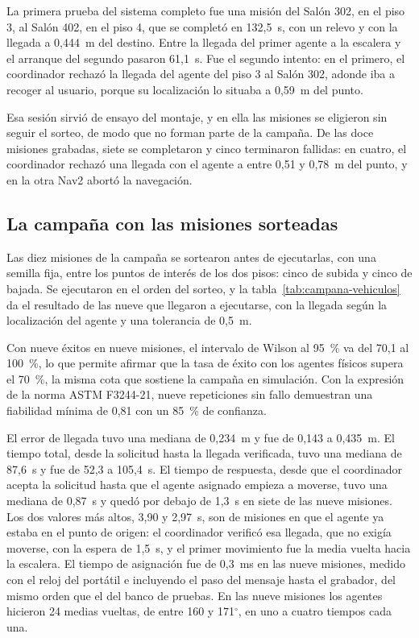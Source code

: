 La primera prueba del sistema completo fue una misión del Salón 302, en el piso 3, al Salón 402, en el piso 4, que se completó en 132,5~s, con un relevo y con la llegada a 0,444~m del destino. Entre la llegada del primer agente a la escalera y el arranque del segundo pasaron 61,1~s. Fue el segundo intento: en el primero, el coordinador rechazó la llegada del agente del piso 3 al Salón 302, adonde iba a recoger al usuario, porque su localización lo situaba a 0,59~m del punto.

Esa sesión sirvió de ensayo del montaje, y en ella las misiones se eligieron sin seguir el sorteo, de modo que no forman parte de la campaña. De las doce misiones grabadas, siete se completaron y cinco terminaron fallidas: en cuatro, el coordinador rechazó una llegada con el agente a entre 0,51 y 0,78~m del punto, y en la otra Nav2 abortó la navegación.

\subsection{La campaña con las misiones sorteadas}

Las diez misiones de la campaña se sortearon antes de ejecutarlas, con una semilla fija, entre los puntos de interés de los dos pisos: cinco de subida y cinco de bajada. Se ejecutaron en el orden del sorteo, y la tabla~\ref{tab:campana-vehiculos} da el resultado de las nueve que llegaron a ejecutarse, con la llegada según la localización del agente y una tolerancia de 0,5~m.

Con nueve éxitos en nueve misiones, el intervalo de Wilson al 95~\% va del 70,1 al 100~\%, lo que permite afirmar que la tasa de éxito con los agentes físicos supera el 70~\%, la misma cota que sostiene la campaña en simulación. Con la expresión de la norma ASTM F3244-21, nueve repeticiones sin fallo demuestran una fiabilidad mínima de 0,81 con un 85~\% de confianza.

El error de llegada tuvo una mediana de 0,234~m y fue de 0,143 a 0,435~m. El tiempo total, desde la solicitud hasta la llegada verificada, tuvo una mediana de 87,6~s y fue de 52,3 a 105,4~s. El tiempo de respuesta, desde que el coordinador acepta la solicitud hasta que el agente asignado empieza a moverse, tuvo una mediana de 0,87~s y quedó por debajo de 1,3~s en siete de las nueve misiones. Los dos valores más altos, 3,90 y 2,97~s, son de misiones en que el agente ya estaba en el punto de origen: el coordinador verificó esa llegada, que no exigía moverse, con la espera de 1,5~s, y el primer movimiento fue la media vuelta hacia la escalera. El tiempo de asignación fue de 0,3~ms en las nueve misiones, medido con el reloj del portátil e incluyendo el paso del mensaje hasta el grabador, del mismo orden que el del banco de pruebas. En las nueve misiones los agentes hicieron 24 medias vueltas, de entre 160 y 171$^\circ$, en uno a cuatro tiempos cada una.

